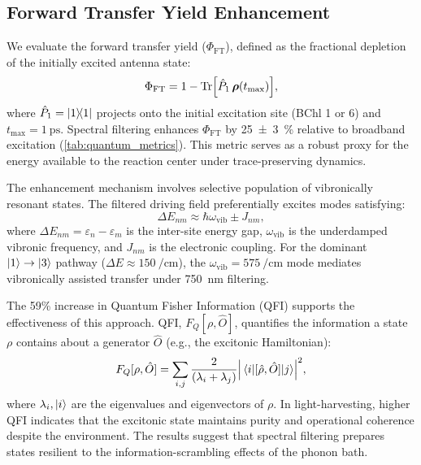 \documentclass[journal=jpcl,manuscript=letter]{achemso}
\begin{document}
\subsection*{Forward Transfer Yield Enhancement}

We evaluate the forward transfer yield ($\Phi_{\mathrm{FT}}$), defined as the fractional depletion of the initially excited antenna state:
\begin{equation}
\Phi_{\mathrm{FT}} = 1 - \Tr[\hat{P}_{1}\,\vb*{\rho}(t_{\max})],
\label{eq:ETE}
\end{equation}
where $\hat{P}_{1} = \dyad{1}$ projects onto the initial excitation site (BChl 1 or 6) and $t_{\max} = \SI{1}{\pico\second}$. Spectral filtering enhances $\Phi_{\mathrm{FT}}$ by \SI{25(3)}{\percent} relative to broadband excitation (\cref{tab:quantum_metrics}). This metric serves as a robust proxy for the energy available to the reaction center under trace-preserving dynamics.

The enhancement mechanism involves selective population of vibronically resonant states. The filtered driving field preferentially excites modes satisfying:
\begin{equation}
\Delta E_{nm} \approx \hbar\omega_{\mathrm{vib}} \pm J_{nm},
\label{eq:resonance_condition}
\end{equation}
where $\Delta E_{nm} = \varepsilon_n - \varepsilon_m$ is the inter-site energy gap, $\omega_{\mathrm{vib}}$ is the underdamped vibronic frequency, and $J_{nm}$ is the electronic coupling. For the dominant $\ket{1} \to \ket{3}$ pathway ($\Delta E \approx \SI{150}{\per\centi\meter}$), the $\omega_{\mathrm{vib}} = \SI{575}{\per\centi\meter}$ mode mediates vibronically assisted transfer under \SI{750}{\nano\meter} filtering.\cite{Chin2013,Fleming2015,Scholes2015}

The 59\% increase in Quantum Fisher Information (QFI) supports the effectiveness of this approach. QFI, $F_Q[\rho, \hat{O}]$, quantifies the information a state $\rho$ contains about a generator $\hat{O}$ (e.g., the excitonic Hamiltonian):
\begin{equation}
F_Q[\rho, \hat{O}] = \sum_{i,j} \frac{2}{(\lambda_i + \lambda_j)} \abs{\mel{i}{[\hat{\rho}, \hat{O}]}{j}}^2,
\label{eq:QFI}
\end{equation}
where $\lambda_i, \ket{i}$ are the eigenvalues and eigenvectors of $\rho$. In light-harvesting, higher QFI indicates that the excitonic state maintains purity and operational coherence despite the environment.\cite{Pezze2009} The results suggest that spectral filtering prepares states resilient to the information-scrambling effects of the phonon bath.
\end{document}
